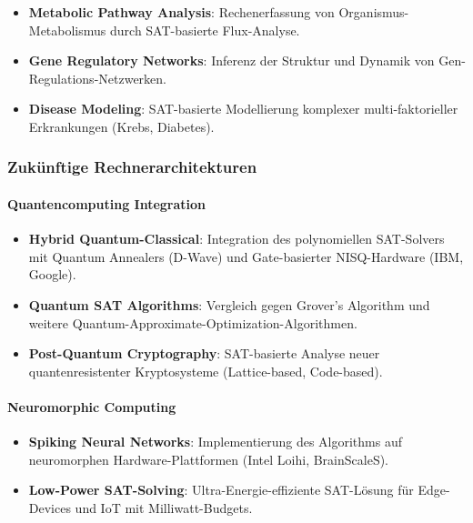 ﻿\documentclass[a4paper,12pt]{article}
\theoremstyle{definition}
\begin{document}
\begin{itemize}
	\item \textbf{Metabolic Pathway Analysis}: Rechenerfassung von Organismus-Metabolismus durch SAT-basierte Flux-Analyse.
	
	\item \textbf{Gene Regulatory Networks}: Inferenz der Struktur und Dynamik von Gen-Regulations-Netzwerken.
	
	\item \textbf{Disease Modeling}: SAT-basierte Modellierung komplexer multi-faktorieller Erkrankungen (Krebs, Diabetes).
\end{itemize}

\subsubsection{Zukünftige Rechnerarchitekturen}

\paragraph{Quantencomputing Integration}

\begin{itemize}
	\item \textbf{Hybrid Quantum-Classical}: Integration des polynomiellen SAT-Solvers mit Quantum Annealers (D-Wave) und Gate-basierter NISQ-Hardware (IBM, Google).
	
	\item \textbf{Quantum SAT Algorithms}: Vergleich gegen Grover's Algorithm und weitere Quantum-Approximate-Optimization-Algorithmen.
	
	\item \textbf{Post-Quantum Cryptography}: SAT-basierte Analyse neuer quantenresistenter Kryptosysteme (Lattice-based, Code-based).
\end{itemize}

\paragraph{Neuromorphic Computing}

\begin{itemize}
	\item \textbf{Spiking Neural Networks}: Implementierung des Algorithms auf neuromorphen Hardware-Plattformen (Intel Loihi, BrainScaleS).
	
	\item \textbf{Low-Power SAT-Solving}: Ultra-Energie-effiziente SAT-Lösung für Edge-Devices und IoT mit Milliwatt-Budgets.
\end{itemize}
\end{document}
